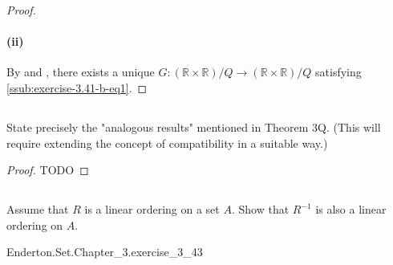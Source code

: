 \documentclass{report}
\begin{document}
\begin{proof}
    \paragraph{(ii)}%

      By  and , there
        exists a unique $G \colon (\mathbb{R} \times \mathbb{R}) / Q \rightarrow
        (\mathbb{R} \times \mathbb{R}) / Q$ satisfying
        \eqref{ssub:exercise-3.41-b-eq1}.

  \end{proof}

\subsection{}%

  State precisely the "analogous results" mentioned in Theorem 3Q.
  (This will require extending the concept of compatibility in a suitable way.)

  \begin{proof}
    TODO
  \end{proof}

\subsection{}%

  Assume that $R$ is a linear ordering on a set $A$.
  Show that $R^{-1}$ is also a linear ordering on $A$.

    {Enderton.Set.Chapter\_3.exercise\_3\_43}
\end{document}
